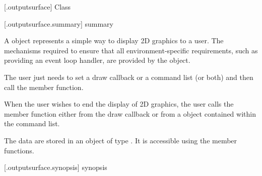  [\iotwod.outputsurface] {Class }

 [\iotwod.outputsurface.summary] { summary}

\pnum
{}%
A  object represents a simple way to display 2D graphics to a user. The mechanisms required to ensure that all environment-specific requirements, such as providing an event loop handler, are provided by the object.

\pnum
The user just needs to set a draw callback or a command list (or both) and then call the  member function. 

\pnum
When the user wishes to end the display of 2D graphics, the user calls the  member function either from the draw callback or from a  object contained within the command list.

\pnum
The data are stored in an object of type . It is accessible using the  member functions.

 [\iotwod.outputsurface.synopsis] { synopsis}


